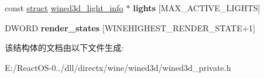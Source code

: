 \begin{DoxyCompactItemize}
\mbox{\label{structwined3d__state_a505a8d80534e840e4e72d76a93a85aaa}} 
const \hyperlink{interfacestruct}{struct} \hyperlink{structwined3d__light__info}{wined3d\+\_\+light\+\_\+info} $\ast$ {\bfseries lights} \mbox{[}M\+A\+X\+\_\+\+A\+C\+T\+I\+V\+E\+\_\+\+L\+I\+G\+H\+TS\mbox{]}
\item 
\mbox{\label{structwined3d__state_acc1601958571580eba287e3a1fd16f1f}} 
D\+W\+O\+RD {\bfseries render\+\_\+states} \mbox{[}W\+I\+N\+E\+H\+I\+G\+H\+E\+S\+T\+\_\+\+R\+E\+N\+D\+E\+R\+\_\+\+S\+T\+A\+TE+1\mbox{]}
\end{DoxyCompactItemize}


该结构体的文档由以下文件生成\+:\begin{DoxyCompactItemize}
\item 
E\+:/\+React\+O\+S-\/0../dll/directx/wine/wined3d/wined3d\+\_\+private.\+h\end{DoxyCompactItemize}
